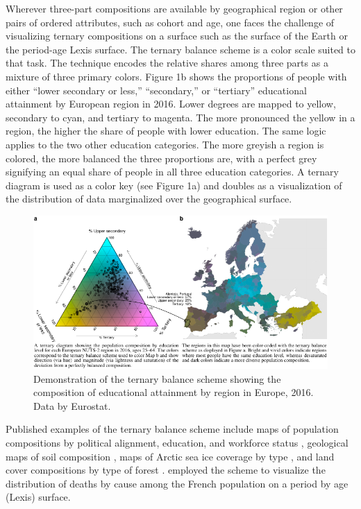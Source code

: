 \documentclass[10pt,twoside,reqno]{article}
\makeatletter
\def\cnstmaxfigwidth{
      \ifdim \Gin@nat@width>\linewidth
        \linewidth
      \else \Gin@nat@width
      \fi
    }
\let\Oldincludegraphics\includegraphics
\renewcommand{\includegraphics}[1]{\Oldincludegraphics[width=\cnstmaxfigwidth]{#1}}
\makeatother
\begin{document}
Wherever three-part compositions are available by geographical region or
other pairs of ordered attributes, such as cohort and age, one faces the
challenge of visualizing ternary compositions on a surface such as the
surface of the Earth or the period-age Lexis surface. The ternary
balance scheme \citep{Brewer1994} is a color scale suited to that task.
The technique encodes the relative shares among three parts as a mixture
of three primary colors. Figure 1b shows the proportions of people with
either ``lower secondary or less,'' ``secondary,'' or ``tertiary''
educational attainment by European region in 2016. Lower degrees are
mapped to yellow, secondary to cyan, and tertiary to magenta. The more
pronounced the yellow in a region, the higher the share of people with
lower education. The same logic applies to the two other education
categories. The more greyish a region is colored, the more balanced the
three proportions are, with a perfect grey signifying an equal share of
people in all three education categories. A ternary diagram is used as a
color key (see Figure 1a) and doubles as a visualization of the
distribution of data marginalized over the geographical surface.

\begin{figure}
\centering
\includegraphics{figure1.pdf}
\caption{Demonstration of the ternary balance scheme showing the
composition of educational attainment by region in Europe, 2016. Data by
Eurostat.}
\end{figure}

Published examples of the ternary balance scheme include maps of
population compositions by political alignment, education, and workforce
status \citep{Dorling2012, Graetz2019, Brewer1994}, geological maps of
soil composition \citep{Metternicht2003}, maps of Arctic sea ice
coverage by type \citep{Denil2015}, and land cover compositions by type
of forest \citep{Pirzamanbein2020, Steidinger2019}. \citet{Schoeley2017}
employed the scheme to visualize the distribution of deaths by cause
among the French population on a period by age (Lexis) surface.
\end{document}
